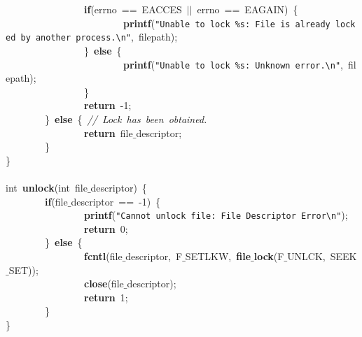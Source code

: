 \mbox{}\ \ \ \ \ \ \ \ \ \ \ \ \ \ \ \ \textbf{if}(errno\ ==\ EACCES\ $|$$|$\ errno\ ==\ EAGAIN)\ \{ \\
\mbox{}\ \ \ \ \ \ \ \ \ \ \ \ \ \ \ \ \ \ \ \ \ \ \ \ \textbf{printf}(\texttt{"{}Unable\ to\ lock\ \%s:\ File\ is\ already\ locked\ by\ another\ process.}\texttt{\textbackslash{}n}\texttt{"{}},\ filepath); \\
\mbox{}\ \ \ \ \ \ \ \ \ \ \ \ \ \ \ \ \}\ \textbf{else}\ \{ \\
\mbox{}\ \ \ \ \ \ \ \ \ \ \ \ \ \ \ \ \ \ \ \ \ \ \ \ \textbf{printf}(\texttt{"{}Unable\ to\ lock\ \%s:\ Unknown\ error.}\texttt{\textbackslash{}n}\texttt{"{}},\ filepath); \\
\mbox{}\ \ \ \ \ \ \ \ \ \ \ \ \ \ \ \ \} \\
\mbox{}\ \ \ \ \ \ \ \ \ \ \ \ \ \ \ \ \textbf{return}\ -1; \\
\mbox{}\ \ \ \ \ \ \ \ \}\ \textbf{else}\ \{\ \textit{//\ Lock\ has\ been\ obtained.} \\
\mbox{}\ \ \ \ \ \ \ \ \ \ \ \ \ \ \ \ \textbf{return}\ file$\_$descriptor; \\
\mbox{}\ \ \ \ \ \ \ \ \} \\
\mbox{}\} \\
\mbox{} \\
\mbox{}int\ \textbf{unlock}(int\ file$\_$descriptor)\ \{ \\
\mbox{}\ \ \ \ \ \ \ \ \textbf{if}(file$\_$descriptor\ ==\ -1)\ \{ \\
\mbox{}\ \ \ \ \ \ \ \ \ \ \ \ \ \ \ \ \textbf{printf}(\texttt{"{}Cannot\ unlock\ file:\ File\ Descriptor\ Error}\texttt{\textbackslash{}n}\texttt{"{}}); \\
\mbox{}\ \ \ \ \ \ \ \ \ \ \ \ \ \ \ \ \textbf{return}\ 0; \\
\mbox{}\ \ \ \ \ \ \ \ \}\ \textbf{else}\ \{ \\
\mbox{}\ \ \ \ \ \ \ \ \ \ \ \ \ \ \ \ \textbf{fcntl}(file$\_$descriptor,\ F$\_$SETLKW,\ \textbf{file$\_$lock}(F$\_$UNLCK,\ SEEK$\_$SET)); \\
\mbox{}\ \ \ \ \ \ \ \ \ \ \ \ \ \ \ \ \textbf{close}(file$\_$descriptor); \\
\mbox{}\ \ \ \ \ \ \ \ \ \ \ \ \ \ \ \ \textbf{return}\ 1; \\
\mbox{}\ \ \ \ \ \ \ \ \} \\
\mbox{}\} \\

\clearpage
\normalsize
\rmfamily
